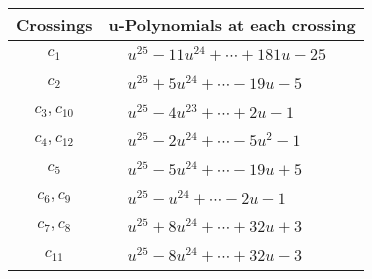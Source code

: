 \documentclass[1p]{elsarticle_modified}
\theoremstyle{definition}
\begin{document}
\begin{tabular}{m{50pt}|m{274pt}}
Crossings & \hspace{64pt}u-Polynomials at each crossing \\
\hline $$\begin{aligned}c_{1}\end{aligned}$$&$\begin{aligned}
&u^{25}-11 u^{24}+\cdots+181 u-25
\end{aligned}$\\
\hline $$\begin{aligned}c_{2}\end{aligned}$$&$\begin{aligned}
&u^{25}+5 u^{24}+\cdots-19 u-5
\end{aligned}$\\
\hline $$\begin{aligned}c_{3},c_{10}\end{aligned}$$&$\begin{aligned}
&u^{25}-4 u^{23}+\cdots+2 u-1
\end{aligned}$\\
\hline $$\begin{aligned}c_{4},c_{12}\end{aligned}$$&$\begin{aligned}
&u^{25}-2 u^{24}+\cdots-5 u^2-1
\end{aligned}$\\
\hline $$\begin{aligned}c_{5}\end{aligned}$$&$\begin{aligned}
&u^{25}-5 u^{24}+\cdots-19 u+5
\end{aligned}$\\
\hline $$\begin{aligned}c_{6},c_{9}\end{aligned}$$&$\begin{aligned}
&u^{25}- u^{24}+\cdots-2 u-1
\end{aligned}$\\
\hline $$\begin{aligned}c_{7},c_{8}\end{aligned}$$&$\begin{aligned}
&u^{25}+8 u^{24}+\cdots+32 u+3
\end{aligned}$\\
\hline $$\begin{aligned}c_{11}\end{aligned}$$&$\begin{aligned}
&u^{25}-8 u^{24}+\cdots+32 u-3
\end{aligned}$\\
\hline
\end{tabular}\\~\\
\end{document}
